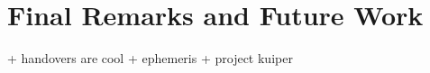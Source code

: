 \documentclass[IN,11pt,twoside,openright,idp,english]{tumthesis}
\begin{document}











\chapter{Final Remarks and Future Work}
+ handovers are cool
+ ephemeris
+ project kuiper 
\end{document}
